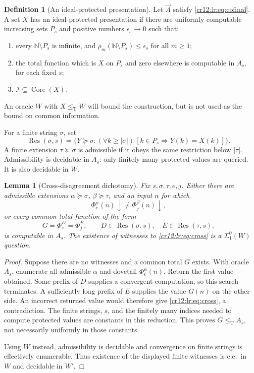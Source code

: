 \documentclass[11pt,letterpaper]{article}
\theoremstyle{plain}
\newtheorem{lemma}[theorem]{Lemma}
\theoremstyle{definition}
\newtheorem{definition}[theorem]{Definition}
\theoremstyle{remark}
\numberwithin{equation}{section}
\newcommand{\N}{\mathbb N}
\newcommand{\leT}{\leq_{\mathrm T}}
\newcommand{\Core}{\operatorname{Core}}
\newcommand{\I}{\mathcal I}
\newcommand{\Res}{\operatorname{Res}}
\begin{document}
\begin{definition}[An ideal-protected presentation]\label{cr12:lr:def:protected}
Let $\vec A$ satisfy \eqref{cr12:lr:eq:cofinal}. A set $X$ has an ideal-protected
presentation if there are uniformly computable increasing sets $P_s$ and positive
numbers $\epsilon_s\to0$ such that:
\begin{enumerate}[label=\textup{(\roman*)}]
\item every $\N\setminus P_s$ is infinite, and $\rho_m(\N\setminus P_s)\leq\epsilon_s$
for all $m\geq1$;
\item the total function which is $X$ on $P_s$ and zero elsewhere is computable in
$A_s$, for each fixed $s$;
\item $\I\subseteq\Core(X)$.
\end{enumerate}
An oracle $W$ with $X\leT W$ will bound the construction, but is not used as the bound
on common information.
\end{definition}

For a finite string $\sigma$, set
\[
 \Res(\sigma,s)=
 \{Y\succeq\sigma:(\forall k\geq|\sigma|)\,[k\in P_s\Longrightarrow Y(k)=X(k)]\}.
\]
A finite extension $\tau\succeq\sigma$ is admissible if it obeys the same restriction
below $|\tau|$. Admissibility is decidable in $A_s$: only finitely many protected
values are queried. It is also decidable in $W$.

\begin{lemma}[Cross-disagreement dichotomy]\label{cr12:lr:lem:cross}
Fix $s,\sigma,\tau,e,j$. Either there are admissible extensions $\alpha\succeq\sigma$,
$\beta\succeq\tau$, and an input $n$ for which
\begin{equation}\label{cr12:lr:eq:cross}
 \Phi_e^\alpha(n)\downarrow\ne\Phi_j^\beta(n)\downarrow,
\end{equation}
or every common total function of the form
\[
 G=\Phi_e^D=\Phi_j^E,
 \qquad D\in\Res(\sigma,s),\quad
 E\in\Res(\tau,s),
\]
is computable in $A_s$. The existence of witnesses to \eqref{cr12:lr:eq:cross} is a
$\Sigma^0_1(W)$ question.
\end{lemma}
\begin{proof}
Suppose there are no witnesses and a common total $G$ exists. With oracle $A_s$,
enumerate all admissible $\alpha$ and dovetail $\Phi_e^\alpha(n)$. Return the first
value obtained. Some prefix of $D$ supplies a convergent computation, so this search
terminates. A sufficiently long prefix of $E$ supplies the value $G(n)$ on the other
side. An incorrect returned value would therefore give \eqref{cr12:lr:eq:cross}, a
contradiction. The finite strings, $s$, and the finitely many indices needed to compute
protected values are constants in this reduction. This proves $G\leT A_s$, not
necessarily uniformly in those constants.

Using $W$ instead, admissibility is decidable and convergence on finite strings is
effectively enumerable. Thus existence of the displayed finite witnesses is c.e.\ in
$W$ and decidable in $W'$.
\end{proof}
\end{document}

